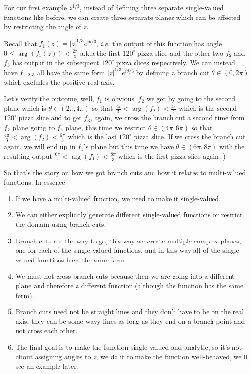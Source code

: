 \documentclass[aps,preprint,preprintnumbers,nofootinbib,showpacs,prd]{revtex4-1}
\newcommand{\ie}{{\it i.e.} }
\begin{document}
For our first example $z^{1/3}$, instead of defining three separate single-valued functions like before, we can create three separate planes which can be affected by restricting the angle of $z$.

Recall that $f_1(z) = |z|^{1/3}e^{i\bar\theta/3}$, \ie the output of this function has angle $0 \le \arg(f_1(z)) < \frac{2\pi}{3}$ a.k.a the first $120^\circ$ pizza slice and the other two $f_2$ and $f_3$ has output in the subsequent $120^\circ$ pizza slices respectively. We can instead have $f_{1,2,3}$ all have the same form $|z|^{1/3} e^{i\theta/3}$ by defining a branch cut $\theta \in (0, 2\pi)$ which excludes the positive real axis.

Let's verify the outcome, well, $f_1$ is obvious, $f_2$ we get by going to the second plane which is $\theta \in (2\pi, 4\pi)$ so that $\frac{2\pi}{3} < \arg(f_2) < \frac{4\pi}{3}$ which is the second $120^\circ$ pizza slice and to get $f_3$, again, we cross the branch cut a second time from $f_2$ plane going to $f_3$ plane, this time we restrict $\theta \in (4\pi, 6\pi)$ so that $\frac{4\pi}{3} < \arg(f_2) < \frac{6\pi}{3}$ which is the last $120^\circ$ pizza slice. If we cross the branch cut again, we will end up in $f_1$'s plane but this time we have $\theta \in (6\pi, 8\pi)$ with the resulting output $\frac{6\pi}{3} < \arg(f_1) < \frac{8\pi}{3}$ which is the first pizza slice again :)

So that's the story on how we got branch cuts and how it relates to multi-valued functions. In essence
%
\begin{enumerate}
%
\item If we have a multi-valued function, we need to make it single-valued.
%
\item We can either explicitly generate different single-valued functions or restrict the domain using branch cuts.
%
\item Branch cuts are the way to go, this way we create multiple complex planes, one for each of the single valued functions, and in this way all of the single-valued functions have the same form.
%
\item We must not cross branch cuts because then we are going into a different plane and therefore a different function (although the function has the same form).
%
\item Branch cuts need not be straight lines and they don't have to be on the real axis, they can be some wavy lines as long as they end on a branch point and not cross each other.
%
\item The final goal is to make the function single-valued and analytic, so it's not about assigning angles to $z$, we do it to make the function well-behaved, we'll see an example later.
\end{enumerate}
%
\end{document}
